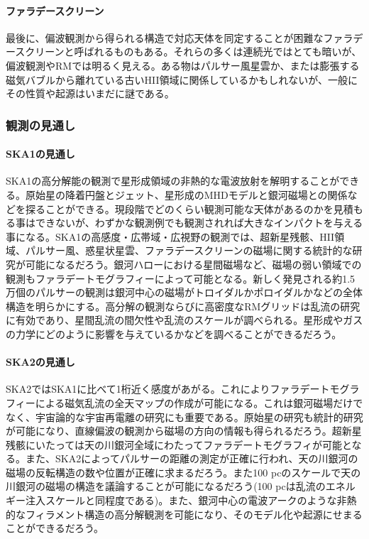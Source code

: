 \paragraph{ファラデースクリーン}

最後に、偏波観測から得られる構造で対応天体を同定することが困難なファラデースクリーンと呼ばれるものもある。それらの多くは連続光ではとても暗いが、偏波観測やRMでは明るく見える。ある物はパルサー風星雲か、または膨張する磁気バブルから離れている古いHII領域に関係しているかもしれないが、一般にその性質や起源はいまだに謎である。


\subsubsection{観測の見通し}
\label{c06.s2.ss2.sss2}

\paragraph{SKA1の見通し}

SKA1の高分解能の観測で星形成領域の非熱的な電波放射を解明することができる。原始星の降着円盤とジェット、星形成のMHDモデルと銀河磁場との関係などを探ることができる。現段階でどのくらい観測可能な天体があるのかを見積もる事はできないが、わずかな観測例でも観測されれば大きなインパクトを与える事になる。SKA1の高感度・広帯域・広視野の観測では、超新星残骸、HII領域、パルサー風、惑星状星雲、ファラデースクリーンの磁場に関する統計的な研究が可能になるだろう。銀河ハローにおける星間磁場など、磁場の弱い領域での観測もファラデートモグラフィーによって可能となる。新しく発見される約1.5万個のパルサーの観測は銀河中心の磁場がトロイダルかポロイダルかなどの全体構造を明らかにする。高分解の観測ならびに高密度なRMグリッドは乱流の研究に有効であり、星間乱流の間欠性や乱流のスケールが調べられる。星形成やガスの力学にどのように影響を与えているかなどを調べることができるだろう。

\paragraph{SKA2の見通し}

SKA2ではSKA1に比べて1桁近く感度があがる。これによりファラデートモグラフィーによる磁気乱流の全天マップの作成が可能になる。これは銀河磁場だけでなく、宇宙論的な宇宙再電離の研究にも重要である。原始星の研究も統計的研究が可能になり、直線偏波の観測から磁場の方向の情報も得られるだろう。超新星残骸にいたっては天の川銀河全域にわたってファラデートモグラフィが可能となる。また、SKA2によってパルサーの距離の測定が正確に行われ、天の川銀河の磁場の反転構造の数や位置が正確に求まるだろう。また100 pcのスケールで天の川銀河の磁場の構造を議論することが可能になるだろう(100 pcは乱流のエネルギー注入スケールと同程度である)。また、銀河中心の電波アークのような非熱的なフィラメント構造の高分解観測を可能になり、そのモデル化や起源にせまることができるだろう。


